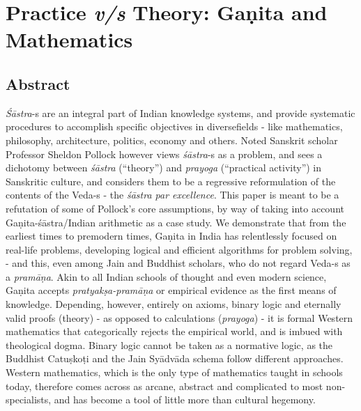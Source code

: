 \chapter[Practice {\sl  v/s} Theory: Gaṇita and Mathematics]{Practice {\sl\bfseries v/s} Theory: Gaṇita and Mathematics}\label{chapter\thechapter:begin}


\section*{Abstract}

{\sl Śāstra}-s are an integral part of Indian knowledge systems, and provide systematic procedures to accomplish specific objectives in diverse\break fields - like mathematics, philosophy, architecture, politics, economy and others. Noted Sanskrit scholar Professor Sheldon Pollock however views {\sl śāstra}-s as a problem, and sees a dichotomy between {\sl śāstra} (``theory'') and {\sl prayoga} (``practical activity'') in Sanskritic culture, and considers them to be a regressive reformulation of the contents of the Veda-s - the {\sl śāstra par excellence}. This paper is meant to be a refutation of some of Pollock's core assumptions, by way of taking into account Gaṇita-śāstra/Indian arithmetic as a case study. We demonstrate that from the earliest times to premodern times, Gaṇita in India has relentlessly focused on real-life problems, developing logical and efficient algorithms for problem solving, - and this, even among Jain and Buddhist scholars, who do not regard Veda-s as a {\sl pramāṇa}. Akin to all Indian schools of thought and even modern science, Gaṇita accepts {\sl pratyakṣa-pramāṇa} or empirical evidence as the first means of knowledge. Depending, however, entirely on axioms, binary logic and eternally valid proofs (theory) - as opposed to calculations ({\sl prayoga}) -  it is formal Western mathematics that categorically rejects the empirical world, and is imbued with theological dogma. Binary logic cannot be taken as a normative logic, as the Buddhist Catuṣkoṭi and the Jain Syādvāda schema follow different approaches. Western mathematics, which is the only type of mathematics taught in schools today, therefore comes across as arcane, abstract and complicated to most non-specialists, and has become a tool of little more than cultural hegemony.\\[-20pt] 

